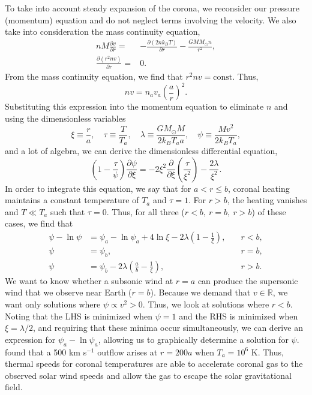 \begin{enumerate}
\begin{enumerate}
				\par To take into account steady expansion of the corona, we reconsider our pressure (momentum) equation and do not neglect terms involving the velocity. We also take into consideration the mass continuity equation,
				\begin{align}
					nM\frac{\partial v}{\partial r} =& -\frac{\partial(2nk_BT)}{\partial r} - \frac{GMM_{\odot}n}{r^2}, \\
					\frac{\partial(r^2nv)}{\partial r} =& 0.
				\end{align}
				From the mass continuity equation, we find that $r^2nv=\text{const}$. Thus, 
				\begin{equation}
					nv = n_av_a\left(\frac{a}{r}\right)^2.
				\end{equation}
				Substituting this expression into the momentum equation to eliminate $n$ and using the dimensionless variables
				\begin{equation}
					\xi\equiv\frac{r}{a},\quad\tau\equiv\frac{T}{T_a},\quad\lambda\equiv\frac{GM_{\odot}M}{2k_BT_aa},\quad\psi\equiv\frac{Mv^2}{2k_BT_a},
				\end{equation}
				and a lot of algebra, we can derive the dimensionless differential equation,
				\begin{equation}
					\left(1 - \frac{\tau}{\psi}\right)\frac{\partial\psi}{\partial\xi} = -2\xi^2\frac{\partial}{\partial\xi}\left(\frac{\tau}{\xi^2}\right) - \frac{2\lambda}{\xi^2}.
				\end{equation}
				In order to integrate this equation, we say that for $a<r\le b$, coronal heating maintains a constant temperature of $T_a$ and $\tau=1$. For $r>b$, the heating vanishes and $T\ll T_a$ such that $\tau=0$. Thus, for all three ($r<b,~r=b,~r>b$) of these cases, we find that
				\begin{align}
					\psi - \ln{\psi} &= \psi_a - \ln{\psi_a} + 4\ln{\xi} - 2\lambda\left(1-\frac{1}{\xi}\right),&\quad r<b, \\
					\psi &= \psi_b,&\quad r=b, \\
					\psi &= \psi_b - 2\lambda(\frac{a}{b} - \frac{1}{\xi}),&\quad r>b.
				\end{align}
				We want to know whether a subsonic wind at $r=a$ can produce the supersonic wind that we observe near Earth ($r=b$). Because we demand that $v\in\mathbb{R}$, we want only solutions where $\psi\propto v^2 >0$. Thus, we look at solutions where $r<b$. Noting that the LHS is minimized when $\psi=1$ and the RHS is minimized when $\xi=\lambda/2$, and requiring that these minima occur simultaneously, we can derive an expression for $\psi_a-\ln{\psi_a}$, allowing us to graphically determine a solution for $\psi$. \citet{parker_dynamics_1958} found that a 500 km s$^{-1}$ outflow arises at $r=200a$ when $T_a=10^6$ K. Thus, thermal speeds for coronal temperatures are able to accelerate coronal gas to the observed solar wind speeds and allow the gas to escape the solar gravitational field. 
			\end{enumerate}
		\end{enumerate}